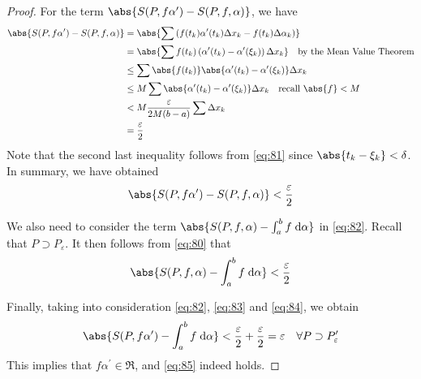 \documentclass[thmcnt=section, 12pt]{elegantbook}
\begin{document}
\begin{proof}
    \par For the term $\abs{ S(P, f \alpha^\prime) - S(P, f, \alpha) }$, we have 
    \begin{align*}
        \abs{ 
            S(P, f \alpha^\prime) 
            - S(P, f, \alpha) 
        } &= \abs{
            \sum \left( f(t_k) \alpha^\prime(t_k) \Delta x_k - f(t_k) \Delta \alpha_k \right)
        } \\ 
        &= \abs{
            \sum  f(t_k) \left( \alpha^\prime(t_k)  - \alpha^\prime(\xi_k) \right) \Delta x_k
        } \quad \text{by the Mean Value Theorem} \\ 
        &\leq \sum \abs{f(t_k)} \abs{
            \alpha^\prime(t_k)  
            - \alpha^\prime(\xi_k)
        } \Delta x_k \\ 
        &\leq M \sum \abs{
            \alpha^\prime(t_k)  
            - \alpha^\prime(\xi_k)
        } \Delta x_k 
        \quad \text{recall $\abs{f} < M$} \\ 
        &< M \frac{\varepsilon}{2M(b-a)} \sum \Delta x_k \\ 
        &= \frac{\varepsilon}{2}
    \end{align*}
    Note that the second last inequality follows from \eqref{eq:81} since $\abs{t_k - \xi_k} < \delta$. In summary, we have obtained
    \begin{align}
        \abs{ 
            S(P, f \alpha^\prime) 
            - S(P, f, \alpha) 
        } < \frac{\varepsilon}{2}
        \label{eq:83}
    \end{align}

    \par We also need to consider the term $\abs{S(P, f, \alpha) - \int_a^b f \; \mathrm{d}\alpha}$ in \eqref{eq:82}. Recall that $P \supset P_\varepsilon$. It then follows from \eqref{eq:80} that 
    \begin{align}
        \abs{
            S(P, f, \alpha)
            - \int_a^b f \; \mathrm{d}\alpha
        } < \frac{\varepsilon}{2}
        \label{eq:84}
    \end{align}

    \par Finally, taking into consideration \eqref{eq:82}, \eqref{eq:83} and \eqref{eq:84}, we obtain
    \begin{align*}
        \abs{
            S(P, f \alpha^\prime)
            - \int_a^b f \; \mathrm{d}\alpha
        } < \frac{\varepsilon}{2} + \frac{\varepsilon}{2}
        = \varepsilon
        \quad \forall P \supset P^\prime_\varepsilon
    \end{align*}
    This implies that $f\alpha^\prime \in \mathfrak{R}$, and \eqref{eq:85} indeed holds.
\end{proof}
\end{document}
